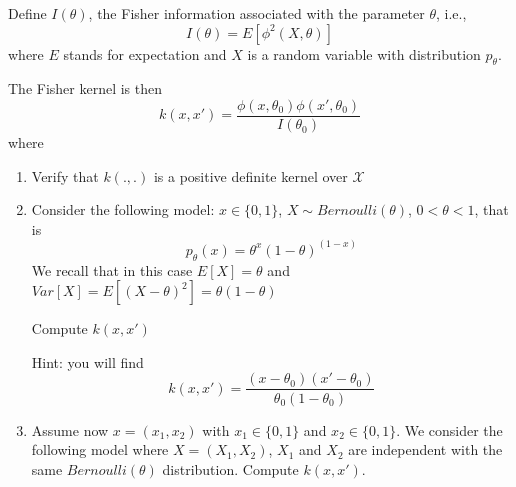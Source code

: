 \documentclass[11pt]{article}
\begin{document}
Define $I(\theta)$, the Fisher information associated with the parameter $\theta$, i.e., 
\begin{equation}
I(\theta)=E[\phi^2(X,\theta)]
\end{equation}
where $E$ stands for expectation and $X$ is a random variable with distribution $p_\theta$. 

The Fisher kernel is then 
\begin{equation}
k(x,x')=\frac{\phi(x,\theta_0)\phi(x',\theta_0)}{I(\theta_0)}
\end{equation}
where 
\begin{enumerate}
\item Verify that $k(.,.)$ is a positive definite kernel over $\mathcal{X}$
\item Consider the following model: $x \in \{0,1\}$, $X \sim Bernoulli(\theta)$, $0 < \theta < 1$, that is
\begin{equation}
p_\theta(x)=\theta^x(1-\theta)^{(1-x)} 
\end{equation}
We recall that in this case $E[X]=\theta$ and $Var[X]=E[(X-\theta)^2]=\theta(1-\theta)$

Compute $k(x,x')$

Hint: you will find $$k(x,x')=\frac{(x-\theta_0)(x'-\theta_0)}{\theta_0(1-\theta_0)}$$
\item
Assume now $x=(x_1,x_2)$ with $x_1 \in \{0,1\}$ and $x_2 \in \{0,1\}$. 
We consider the following model where $X=(X_1,X_2)$, $X_1$ and $X_2$ are independent with the same $Bernoulli(\theta)$ distribution. 
Compute $k(x,x')$. 
\end{enumerate}
 


 
\end{document}
